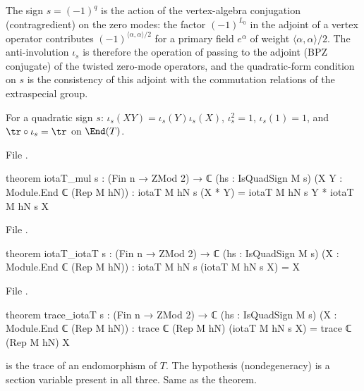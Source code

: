 \begin{physics}
The sign $s=(-1)^{q}$ is the action of the vertex-algebra conjugation (contragredient) on the zero modes: the factor $(-1)^{L_0}$ in the adjoint of a vertex operator contributes $(-1)^{\langle\alpha,\alpha\rangle/2}$ for a primary field $e^{\alpha}$ of weight $\langle\alpha,\alpha\rangle/2$. The anti-involution $\iota_s$ is therefore the operation of passing to the adjoint (BPZ conjugate) of the twisted zero-mode operators, and the quadratic-form condition on $s$ is the consistency of this adjoint with the commutation relations of the extraspecial group.
\end{physics}
\begin{theorem}\label{ch06:thm:iota}
For a quadratic sign $s$: $\iota_s(XY)=\iota_s(Y)\iota_s(X)$, $\iota_s^2=1$, $\iota_s(1)=1$, and
$\tr\circ\iota_s=\tr$ on $\End(T)$.
\end{theorem}
\noindent File .
\begin{leancode}
theorem iotaT_mul {s : (Fin n → ZMod 2) → ℂ} (hs : IsQuadSign M s)
    (X Y : Module.End ℂ (Rep M hN)) : iotaT M hN s (X * Y) = iotaT M hN s Y * iotaT M hN s X
\end{leancode}
\noindent File .
\begin{leancode}
theorem iotaT_iotaT {s : (Fin n → ZMod 2) → ℂ} (hs : IsQuadSign M s)
    (X : Module.End ℂ (Rep M hN)) : iotaT M hN s (iotaT M hN s X) = X
\end{leancode}
\noindent File .
\begin{leancode}
theorem trace_iotaT {s : (Fin n → ZMod 2) → ℂ} (hs : IsQuadSign M s)
    (X : Module.End ℂ (Rep M hN)) : trace ℂ (Rep M hN) (iotaT M hN s X) = trace ℂ (Rep M hN) X
\end{leancode}
\begin{dictionary}
 is the trace of an endomorphism of $T$.  The hypothesis 
(nondegeneracy) is a section variable present in all three.  Same as the theorem.
\end{dictionary}

